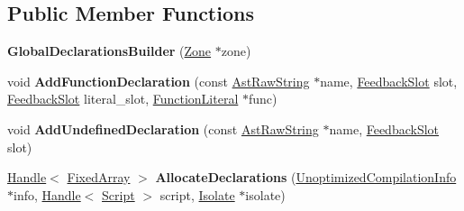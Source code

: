 \subsection*{Public Member Functions}
\begin{DoxyCompactItemize}
\item 
\mbox{\label{classv8_1_1internal_1_1interpreter_1_1BytecodeGenerator_1_1GlobalDeclarationsBuilder_a9e1571a8e8dbc44ff828f4bf641cce6a}} 
{\bfseries Global\+Declarations\+Builder} (\mbox{\hyperlink{classv8_1_1internal_1_1Zone}{Zone}} $\ast$zone)
\item 
\mbox{\label{classv8_1_1internal_1_1interpreter_1_1BytecodeGenerator_1_1GlobalDeclarationsBuilder_ab5a99d76020196fcd8b5cf84836a22d4}} 
void {\bfseries Add\+Function\+Declaration} (const \mbox{\hyperlink{classv8_1_1internal_1_1AstRawString}{Ast\+Raw\+String}} $\ast$name, \mbox{\hyperlink{classv8_1_1internal_1_1FeedbackSlot}{Feedback\+Slot}} slot, \mbox{\hyperlink{classv8_1_1internal_1_1FeedbackSlot}{Feedback\+Slot}} literal\+\_\+slot, \mbox{\hyperlink{classv8_1_1internal_1_1FunctionLiteral}{Function\+Literal}} $\ast$func)
\item 
\mbox{\label{classv8_1_1internal_1_1interpreter_1_1BytecodeGenerator_1_1GlobalDeclarationsBuilder_abce37b8401163ac2b552823c9cbe9259}} 
void {\bfseries Add\+Undefined\+Declaration} (const \mbox{\hyperlink{classv8_1_1internal_1_1AstRawString}{Ast\+Raw\+String}} $\ast$name, \mbox{\hyperlink{classv8_1_1internal_1_1FeedbackSlot}{Feedback\+Slot}} slot)
\item 
\mbox{\label{classv8_1_1internal_1_1interpreter_1_1BytecodeGenerator_1_1GlobalDeclarationsBuilder_a539eac8708f78bc99b138da343fcd4e0}} 
\mbox{\hyperlink{classv8_1_1internal_1_1Handle}{Handle}}$<$ \mbox{\hyperlink{classv8_1_1internal_1_1FixedArray}{Fixed\+Array}} $>$ {\bfseries Allocate\+Declarations} (\mbox{\hyperlink{classv8_1_1internal_1_1UnoptimizedCompilationInfo}{Unoptimized\+Compilation\+Info}} $\ast$info, \mbox{\hyperlink{classv8_1_1internal_1_1Handle}{Handle}}$<$ \mbox{\hyperlink{classv8_1_1internal_1_1Script}{Script}} $>$ script, \mbox{\hyperlink{classv8_1_1internal_1_1Isolate}{Isolate}} $\ast$isolate)

\end{DoxyCompactItemize}
